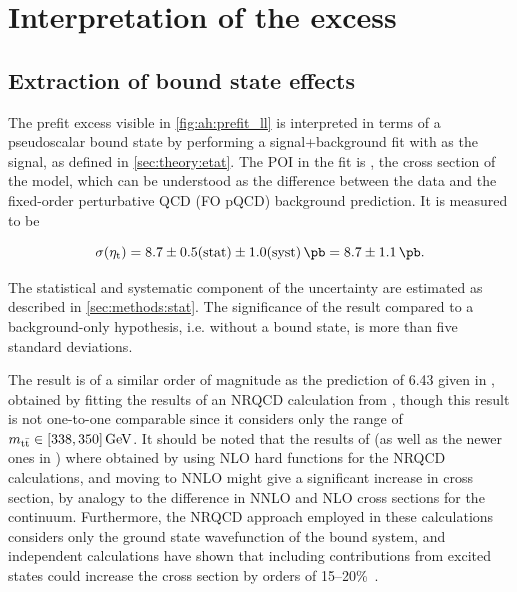 
\section{Interpretation of the excess}
\label{sec:ah:excess}

\subsection{Extraction of \ttbartitle bound state effects}
\label{sec:ah:etat}

The prefit excess visible in \cref{fig:ah:prefit_ll} is interpreted in terms of a pseudoscalar \ttbar bound state by performing a signal+background fit with \etat as the signal, as defined in \cref{sec:theory:etat}. The POI in the fit is \sigetat, the cross section of the \etat model, which can be understood as the difference between the data and the fixed-order perturbative QCD (FO pQCD) background prediction. It is measured to be

\begin{equation}
    \sigetat = 8.7 \pm 0.5 (\text{stat}) \pm 1.0 (\text{syst}) \, \si{\pb} = 8.7 \pm 1.1  \, \si{\pb}.
\end{equation}

The statistical and systematic component of the uncertainty are estimated as described in \cref{sec:methods:stat}. The significance of the result compared to a background-only hypothesis, i.e. without a bound state, is more than five standard deviations.

The result is of a similar order of magnitude as the prediction of \SI{6.43}{\pb} given in , obtained by fitting the results of an NRQCD calculation from , though this result is not one-to-one comparable since it considers only the range of $\mtt \in [338, 350] \, \si{\GeV}$. It should be noted that the results of  (as well as the newer ones in )  where obtained by using NLO hard functions for the NRQCD calculations, and moving to NNLO might give a significant increase in cross section, by analogy to the difference in NNLO and NLO cross sections for the \ttbar continuum. Furthermore, the NRQCD approach employed in these calculations considers only the ground state wavefunction of the bound \ttbar system, and independent calculations have shown that including contributions from excited states could increase the cross section by orders of 15--20\%~\cite{Llanes-Estrada:2024phk,dEnterria:2025ecx}.

